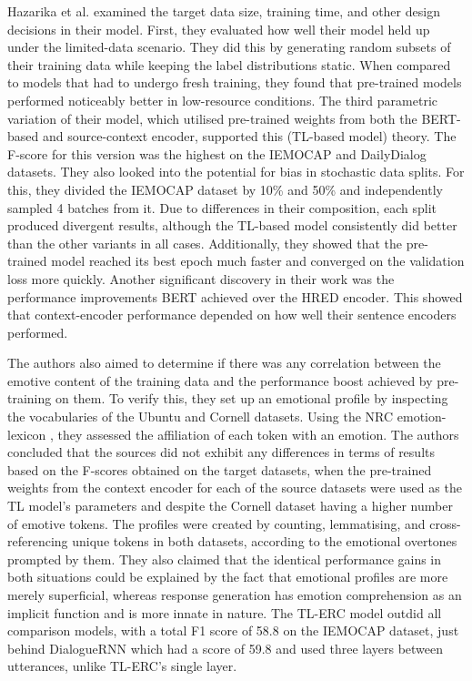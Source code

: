Hazarika et al. examined the target data size, training time, and other design decisions in their model. First, they evaluated how well their model held up under the limited-data scenario. They did this by generating random subsets of their training data while keeping the label distributions static. When compared to models that had to undergo fresh training, they found that pre-trained models performed noticeably better in low-resource conditions. The third parametric variation of their model, which utilised pre-trained weights from both the BERT-based and source-context encoder, supported this (TL-based model) theory. The F-score for this version was the highest on the IEMOCAP and DailyDialog datasets. They also looked into the potential for bias in stochastic data splits. For this, they divided the IEMOCAP dataset by 10\% and 50\% and independently sampled 4 batches from it. Due to differences in their composition, each split produced divergent results, although the TL-based model consistently did better than the other variants in all cases. Additionally, they showed that the pre-trained model reached its best epoch much faster and converged on the validation loss more quickly. Another significant discovery in their work was the performance improvements BERT achieved over the HRED encoder. This showed that context-encoder performance depended on how well their sentence encoders performed.

The authors also aimed to determine if there was any correlation between the emotive content of the training data and the performance boost achieved by pre-training on them. To verify this, they set up an emotional profile by inspecting the vocabularies of the Ubuntu and Cornell datasets. Using the NRC emotion-lexicon \cite{Mohammad2013CROWDSOURCINGAW}, they assessed the affiliation of each token with an emotion. The authors concluded that the sources did not exhibit any differences in terms of results based on the F-scores obtained on the target datasets, when the pre-trained weights from the context encoder for each of the source datasets were used as the TL model's parameters and despite the Cornell dataset having a higher number of emotive tokens. The profiles were created by counting, lemmatising, and cross-referencing unique tokens in both datasets, according to the emotional overtones prompted by them. They also claimed that the identical performance gains in both situations could be explained by the fact that emotional profiles are more merely superficial, whereas response generation has emotion comprehension as an implicit function and is more innate in nature. The TL-ERC model outdid all comparison models, with a total F1 score of 58.8 on the IEMOCAP dataset, just behind DialogueRNN which had a score of 59.8 and used three layers between utterances, unlike TL-ERC's single layer.

